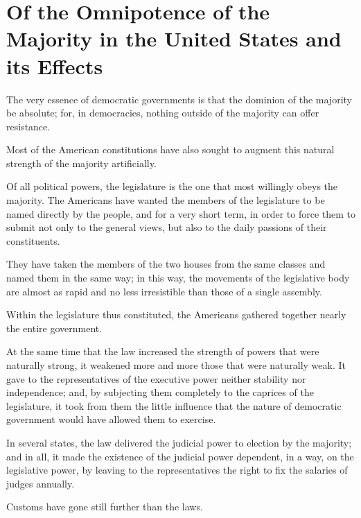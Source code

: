 \chapter{Of the Omnipotence of the Majority in the United States and its Effects}

\nocite{Tocqueville2010}


The very essence of democratic governments is that the dominion of the majority be absolute; for, in democracies, nothing outside of the majority can offer resistance.

Most of the American constitutions have also sought to augment this natural strength of the majority artificially.

Of all political powers, the legislature is the one that most willingly obeys the majority. The Americans have wanted the members of the legislature to be named directly by the people, and for a very short term, in order to force them to submit not only to the general views, but also to the daily passions of their constituents.

They have taken the members of the two houses from the same classes and named them in the same way; in this way, the movements of the legislative body are almost as rapid and no less irresistible than those of a single assembly.

Within the legislature thus constituted, the Americans gathered together nearly the entire government.

At the same time that the law increased the strength of powers that were naturally strong, it weakened more and more those that were naturally weak. It gave to the representatives of the executive power neither stability nor independence; and, by subjecting them completely to the caprices of the legislature, it took from them the little influence that the nature of democratic government would have allowed them to exercise.

In several states, the law delivered the judicial power to election by the majority; and in all, it made the existence of the judicial power dependent, in a way, on the legislative power, by leaving to the representatives the right to fix the salaries of judges annually.

Customs have gone still further than the laws.

